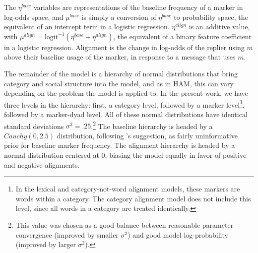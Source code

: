 \documentclass[11pt]{article}
\begin{document}
The $\eta^{base}$ variables are representations of the baseline frequency of a marker in log-odds space, and $\mu^{base}$ is simply a conversion of $\eta^{base}$ to probability space, the equivalent of an intercept term in a logistic regression. $\eta^{align}$ is an additive value, with $\mu^{align} = \textrm{logit}^{-1}(\eta^{base}+\eta^{align})$, the equivalent of a binary feature coefficient in a logistic regression.  Alignment is the change in log-odds of the replier using $m$ above their baseline usage of the marker, in response to a message that uses $m$.

The remainder of the model is a hierarchy of normal distributions that bring category and social structure into the model, and as in HAM, this can vary depending on the problem the model is applied to.  In the present work, we have three levels in the hierarchy: first, a category level, followed by a marker level\footnote{In the lexical and category-not-word alignment models, these markers are words within a category. The category alignment model does not include this level, since all words in a category are treated identically.}, followed by a marker-dyad level. All of these normal distributions have identical standard deviations $\sigma^2=.25$.\footnote{This value was chosen as a good balance between reasonable parameter convergence (improved by smaller $\sigma^2$) and good model log-probability (improved by larger $\sigma^2$).}  The baseline hierarchy is headed by a $Cauchy(0,2.5)$ distribution, following \cite{GelmanEtAl2008}'s suggestion, as fairly uninformative prior for baseline marker frequency. The alignment hierarchy is headed by a normal distribution centered at 0, biasing the model equally in favor of positive and negative alignments.

\end{document}
